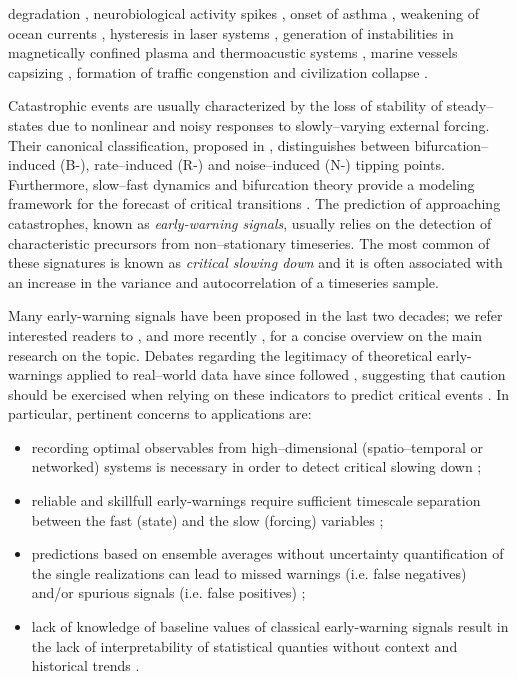 \documentclass[openacc]{rsproca_new}
\begin{document}
\maketitle

\noindent
degradation \cite{OSullivan2023,Kumar2026}, neurobiological activity spikes \cite{Boerner2024}, onset of asthma \cite{Venegas2005,Donovan2015}, weakening of ocean currents \cite{Boers2021,Dijkstra2026}, hysteresis in laser systems \cite{Hohl1995}, generation of instabilities in magnetically confined plasma \cite{Cowley2015} and thermoacustic systems \cite{Pavithran2021}, marine vessels capsizing \cite{Shao2026}, formation of traffic congenstion \cite{Chattopadhyay2026} and civilization collapse \cite{Scheffer2021,Doak2026}.

 Catastrophic events are usually characterized by the loss of stability of steady--states due to nonlinear and noisy responses to slowly--varying external forcing.
Their canonical classification, proposed in \cite{Ashwin2012}, distinguishes between bifurcation--induced (B-), rate--induced (R-) and noise--induced (N-) tipping points.
Furthermore, slow--fast dynamics and bifurcation theory provide a modeling framework for the forecast of critical transitions \cite{Kuehn2011}.
The prediction of approaching catastrophes, known as \emph{early-warning signals}, usually relies on the detection of characteristic precursors from non--stationary timeseries.
The most common of these signatures is known as \emph{critical slowing down} \cite{Tredicce2004} and it is often associated with an increase in the variance and autocorrelation of a timeseries sample.

Many early-warning signals have been proposed in the last two decades; we refer interested readers to \cite{Boettiger2013}, and more recently \cite{Dakos2024}, for a concise overview on the main research on the topic.
Debates regarding the legitimacy of theoretical early-warnings applied to real--world data have since followed \cite{Ditlevsen2010,Bos2014,Dakos2015,Wilkat2019}, suggesting that caution should be exercised when relying on these indicators to predict critical events \cite{Morr2024a,Cui2025,Parry2026,Ditlevsen2026}.
In particular, pertinent concerns to applications are:
\begin{itemize}
  \item recording optimal observables from high--dimensional (spatio--temporal or networked) systems is necessary in order to detect critical slowing down \cite{Lohmann2025b};
  \item reliable and skillfull early-warnings require sufficient timescale separation between the fast (state) and the slow (forcing) variables \cite{Kuehn2011};
  \item predictions based on ensemble averages without uncertainty quantification of the single realizations can lead to missed warnings (i.e. false negatives) and/or spurious signals (i.e. false positives) \cite{Ashwin2025};
  \item lack of knowledge of baseline values of classical early-warning signals result in the lack of interpretability of statistical quanties without context and historical trends \cite{Papapicco2026}.
\end{itemize}
\end{document}
